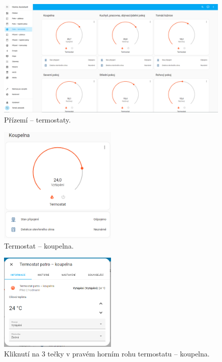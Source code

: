 \begin{Czech}
\begin{figure}[H]
    \centering
    \includegraphics[width=1\textwidth]{pictures/czech/software/thermostats-ground-floor.png}
    \caption{Přízemí – termostaty.}
    \label{fig:thermostats-ground-floor}
\end{figure}
\end{Czech}

\begin{Czech}
\begin{figure}[H]
    \centering
    \includegraphics[width=0.5\textwidth]{pictures/czech/software/thermostat.png}
    \caption{Termostat – koupelna.}
    \label{fig:thermostat}
\end{figure}
\end{Czech}

\begin{Czech}
\begin{figure}[H]
    \centering
    \includegraphics[width=0.5\textwidth]{pictures/czech/software/click-thermostat.png}
    \caption{Kliknutí na 3 tečky v pravém horním rohu termostatu – koupelna.}
    \label{fig:click-thermostat}
\end{figure}
\end{Czech}

